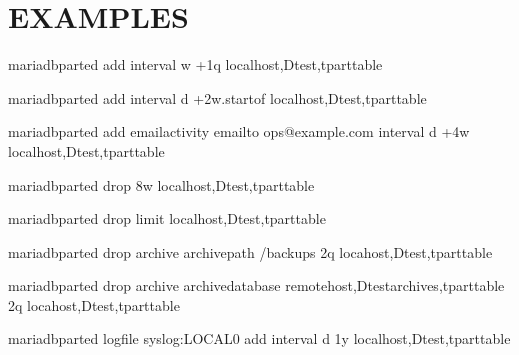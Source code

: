 \documentclass[letterpaper,10pt,english]{sphinxmanual}
\begin{document}
\section{EXAMPLES}
\label{\detokenize{mariadb-parted-fat:examples}}
\begin{sphinxVerbatim}[commandchars=\\\{\}]
mariadb\PYGZhy{}parted \PYGZhy{}\PYGZhy{}add \PYGZhy{}\PYGZhy{}interval w +1q localhost,Dtest,tpart\PYGZus{}table

mariadb\PYGZhy{}parted \PYGZhy{}\PYGZhy{}add \PYGZhy{}\PYGZhy{}interval d +2w.startof localhost,Dtest,tpart\PYGZus{}table

mariadb\PYGZhy{}parted \PYGZhy{}\PYGZhy{}add \PYGZhy{}\PYGZhy{}email\PYGZhy{}activity \PYGZhy{}\PYGZhy{}email\PYGZhy{}to ops@example.com 
           \PYGZhy{}\PYGZhy{}interval d +4w localhost,Dtest,tpart\PYGZus{}table

mariadb\PYGZhy{}parted \PYGZhy{}\PYGZhy{}drop \PYGZhy{}8w localhost,Dtest,tpart\PYGZus{}table

mariadb\PYGZhy{}parted \PYGZhy{}\PYGZhy{}drop \PYGZhy{}\PYGZhy{}limit   
           localhost,Dtest,tpart\PYGZus{}table

mariadb\PYGZhy{}parted \PYGZhy{}\PYGZhy{}drop \PYGZhy{}\PYGZhy{}archive \PYGZhy{}\PYGZhy{}archive\PYGZhy{}path /backups \PYGZhy{}2q 
           locahost,Dtest,tpart\PYGZus{}table

mariadb\PYGZhy{}parted \PYGZhy{}\PYGZhy{}drop \PYGZhy{}\PYGZhy{}archive \PYGZhy{}\PYGZhy{}archive\PYGZhy{}database remotehost,Dtest\PYGZus{}archives,tpart\PYGZus{}table \PYGZhy{}2q 
           locahost,Dtest,tpart\PYGZus{}table

mariadb\PYGZhy{}parted \PYGZhy{}\PYGZhy{}logfile syslog:LOCAL0 \PYGZhy{}\PYGZhy{}add \PYGZhy{}\PYGZhy{}interval d 1y 
           localhost,Dtest,tpart\PYGZus{}table
\end{sphinxVerbatim}
\end{document}
